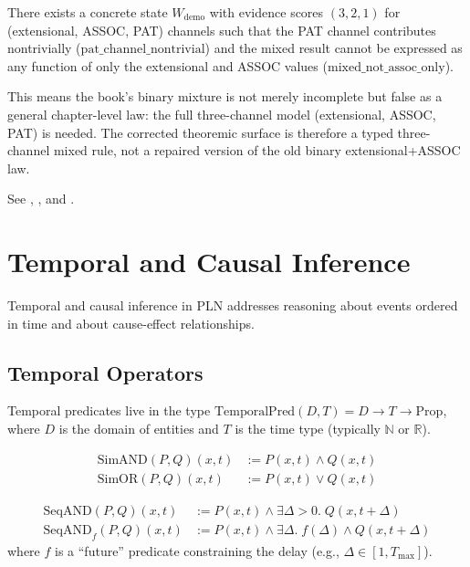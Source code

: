 \documentclass[11pt,openany]{report}
\begin{document}
\begin{theorem}
\label{thm:no-mixed-policy}
There exists a concrete state $W_{\mathrm{demo}}$ with evidence scores
$(3, 2, 1)$ for (extensional, ASSOC, PAT) channels such that the PAT
channel contributes nontrivially ($\mathrm{pat\_channel\_nontrivial}$) and
the mixed result cannot be expressed as any function of only the
extensional and ASSOC values ($\mathrm{mixed\_not\_assoc\_only}$).
\end{theorem}

This means the book's binary mixture is not merely incomplete but false
as a general chapter-level law: the full three-channel model
(extensional, ASSOC, PAT) is needed.
The corrected theoremic surface is therefore a typed three-channel mixed
rule, not a repaired version of the old binary extensional+ASSOC law.

See ,
, and
.


\chapter{Temporal and Causal Inference}
\label{ch:temporal}

Temporal and causal inference in PLN addresses reasoning about events
ordered in time and about cause-effect relationships.

\section{Temporal Operators}

Temporal predicates live in the type
$\mathrm{TemporalPred}(D, T) = D \to T \to \mathrm{Prop}$,
where $D$ is the domain of entities and $T$ is the time type (typically
$\mathbb{N}$ or $\mathbb{R}$).

\begin{definition}
\begin{align}
  \mathrm{SimAND}(P, Q)(x, t) &:= P(x, t) \wedge Q(x, t) \\
  \mathrm{SimOR}(P, Q)(x, t)  &:= P(x, t) \vee Q(x, t)
\end{align}
\end{definition}

\begin{definition}
\begin{align}
  \mathrm{SeqAND}(P, Q)(x, t) &:= P(x, t) \wedge \exists \Delta > 0.\; Q(x, t + \Delta) \\
  \mathrm{SeqAND}_f(P, Q)(x, t) &:= P(x, t) \wedge \exists \Delta.\;
    f(\Delta) \wedge Q(x, t + \Delta)
\end{align}
where $f$ is a ``future'' predicate constraining the delay (e.g.,
$\Delta \in [1, T_{\max}]$).
\end{definition}
\end{document}
